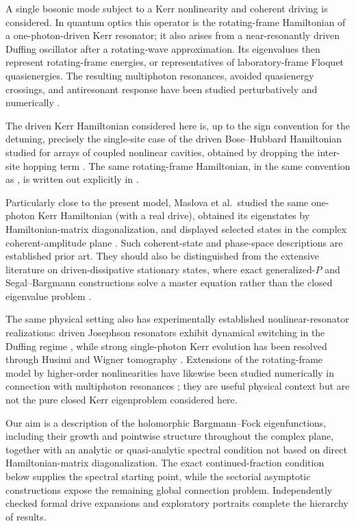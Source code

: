 \documentclass[11pt]{article}
\theoremstyle{remark}
\begin{document}
A single bosonic mode subject to a Kerr nonlinearity and coherent
driving is considered.  In quantum optics this operator is the rotating-frame Hamiltonian of
a one-photon-driven Kerr resonator; it also arises from a near-resonantly
driven Duffing oscillator after a rotating-wave approximation.  Its
eigenvalues then represent rotating-frame energies, or representatives of
laboratory-frame Floquet quasienergies.  The resulting multiphoton resonances,
avoided quasienergy crossings, and antiresonant response have been studied
perturbatively and numerically
\cite{DykmanFistul2005Antiresonance,PeanoThorwart2006Duffing,LeytonPeanoThorwart2012Noise}.

The driven Kerr Hamiltonian considered here is, up to the sign convention for
the detuning, precisely the single-site case of the driven Bose--Hubbard
Hamiltonian studied for arrays of coupled nonlinear cavities, obtained by
dropping the inter-site hopping term \cite{LeBoiteOrsoCiuti2013DrivenBH}.  The
same rotating-frame Hamiltonian, in the same convention as
\cite{LeBoiteOrsoCiuti2013DrivenBH}, is written out explicitly in
\cite{VicentiniEtAl2018CriticalSlowing}.

Particularly close to the present model, Maslova et al.\ studied the same
one-photon Kerr Hamiltonian (with a real drive), obtained its
eigenstates by Hamiltonian-matrix diagonalization, and displayed selected
states in the complex coherent-amplitude plane
\cite{MaslovaEtAl2019Squeezing}.  Such coherent-state and phase-space
descriptions are established prior art.  They should also be distinguished
from the extensive literature on driven-dissipative stationary states, where
exact generalized-\(P\) and Segal--Bargmann constructions solve a master
equation rather than the closed eigenvalue problem
\cite{DrummondWalls1980Bistability,RobertsClerk2020Kerr}.

The same physical setting also has experimentally established nonlinear-resonator
realizations: driven Josephson resonators exhibit dynamical switching in the
Duffing regime \cite{SiddiqiEtAl2004Bifurcation}, while strong single-photon
Kerr evolution has been resolved through Husimi and Wigner tomography
\cite{KirchmairEtAl2013Kerr}.  Extensions of the rotating-frame model by
higher-order nonlinearities have likewise been studied numerically in connection
with multiphoton resonances \cite{AnikinEtAl2021Multiphoton}; they are useful
physical context but are not the pure closed Kerr eigenproblem considered here.

Our aim is a description of the holomorphic Bargmann--Fock eigenfunctions,
including their growth and pointwise structure throughout the complex plane, together with
an analytic or quasi-analytic spectral condition not based on direct
Hamiltonian-matrix diagonalization.  The exact continued-fraction condition
below supplies the spectral starting point, while the sectorial asymptotic
constructions expose the remaining global connection problem.
Independently checked formal drive expansions and exploratory portraits
complete the hierarchy of results.
\end{document}
